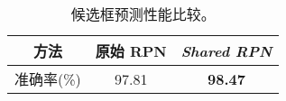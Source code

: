 \begin{table}[t]
	\centering
	\wuhao
	\caption{候选框预测性能比较。}
	\vspace{0.3cm}
	\begin{tabular}{ccc}
		\toprule[1.5pt]
		方法        & 原始 RPN & \textit{Shared RPN}  \\ \midrule
		准确率(\%)  & 97.81      & \textbf{98.47}       \\
		\bottomrule[1.5pt]
	\end{tabular}
	\label{table:rpn_result}
\end{table}
